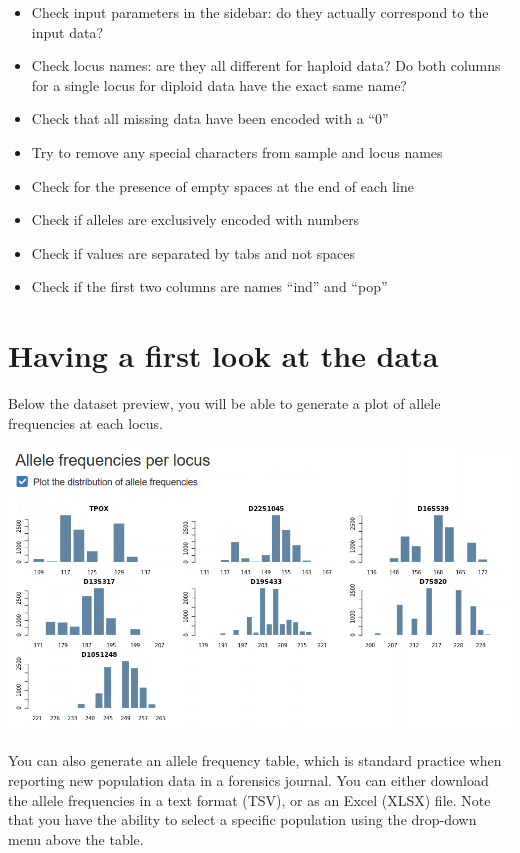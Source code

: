 \documentclass[
]{book}
\providecommand{\tightlist}{%
  \setlength{\itemsep}{0pt}\setlength{\parskip}{0pt}}
\begin{document}
\begin{itemize}
\tightlist
\item
  Check input parameters in the sidebar: do they actually correspond to the input data?
\item
  Check locus names: are they all different for haploid data? Do both columns for a single locus for diploid data have the exact same name?
\item
  Check that all missing data have been encoded with a ``0''
\item
  Try to remove any special characters from sample and locus names
\item
  Check for the presence of empty spaces at the end of each line
\item
  Check if alleles are exclusively encoded with numbers
\item
  Check if values are separated by tabs and not spaces
\item
  Check if the first two columns are names ``ind'' and ``pop''
\end{itemize}

\hypertarget{having-a-first-look-at-the-data}{%
\section{Having a first look at the data}\label{having-a-first-look-at-the-data}}

Below the dataset preview, you will be able to generate a plot of allele frequencies
at each locus.

\includegraphics[width=0.8\linewidth]{img/capture_import_2}

You can also generate an allele frequency table, which is standard practice when
reporting new population data in a forensics journal. You can either download
the allele frequencies in a text format (TSV), or as an Excel (XLSX) file. Note
that you have the ability to select a specific population using the drop-down menu
above the table.
\end{document}

